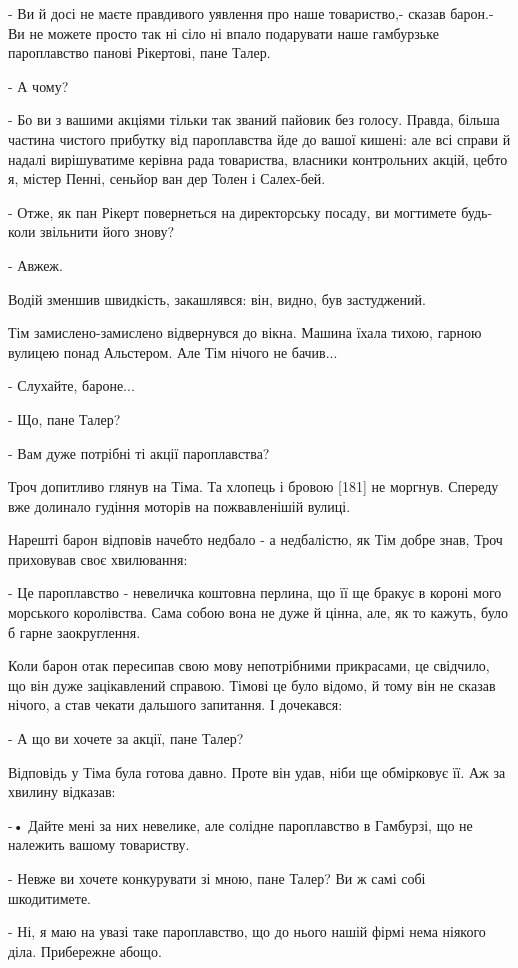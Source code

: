 - Ви й досі не маєте правдивого уявлення про наше товариство,- сказав барон.- Ви не можете просто так ні сіло ні впало подарувати наше гамбурзьке пароплавство панові Рікертові, пане Талер.

- А чому?

- Бо ви з вашими акціями тільки так званий пайовик без голосу. Правда, більша частина чистого прибутку від пароплавства йде до вашої кишені: але всі справи й надалі вирішуватиме керівна рада товариства, власники контрольних акцій, цебто я, містер Пенні, сеньйор ван дер Толен і Салех-бей.

- Отже, як пан Рікерт повернеться на директорську посаду, ви могтимете будь-коли звільнити його знову?

- Авжеж.

Водій зменшив швидкість, закашлявся: він, видно, був застуджений.

Тім замислено-замислено відвернувся до вікна. Машина їхала тихою, гарною вулицею понад Альстером. Але Тім нічого не бачив...

- Слухайте, бароне...

- Що, пане Талер?

- Вам дуже потрібні ті акції пароплавства?

Троч допитливо глянув на Тіма. Та хлопець і бровою [181] не моргнув. Спереду вже долинало гудіння моторів на пожвавленішій вулиці.

Нарешті барон відповів начебто недбало - а недбалістю, як Тім добре знав, Троч приховував своє хвилювання:

- Це пароплавство - невеличка коштовна перлина, що її ще бракує в короні мого морського королівства. Сама собою вона не дуже й цінна, але, як то кажуть, було б гарне заокруглення.

Коли барон отак пересипав свою мову непотрібними прикрасами, це свідчило, що він дуже зацікавлений справою. Тімові це було відомо, й тому він не сказав нічого, а став чекати дальшого запитання. І дочекався:

- А що ви хочете за акції, пане Талер?

Відповідь у Тіма була готова давно. Проте він удав, ніби ще обмірковує її. Аж за хвилину відказав:

-• Дайте мені за них невелике, але солідне пароплавство в Гамбурзі, що не належить вашому товариству.

- Невже ви хочете конкурувати зі мною, пане Талер? Ви ж самі собі шкодитимете.

- Ні, я маю на увазі таке пароплавство, що до нього нашій фірмі нема ніякого діла. Прибережне абощо.

